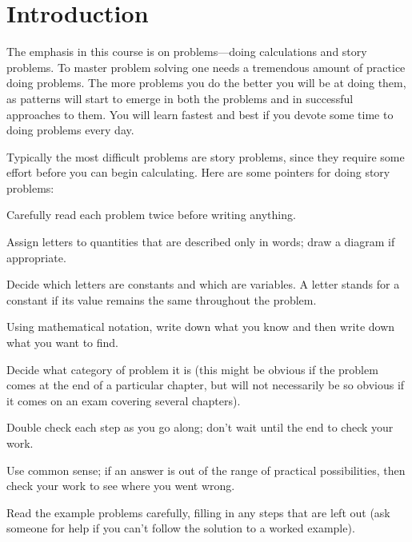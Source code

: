 \chapter{Introduction}{}

The emphasis in this course is on problems---doing calculations and story
problems.  To master problem solving one needs a tremendous amount of
practice doing problems. The more problems you do the better you will
be at doing them, as patterns will start to emerge in both the
problems and in successful approaches to them. You will learn fastest
and best if you devote some time to doing problems every day.

Typically the most difficult problems are story problems, since they
require some effort before you can begin calculating.
Here are some pointers for doing story problems:

\beginlist

\item{\question}
Carefully read each problem twice before writing anything.

\item {\question}
Assign letters to quantities that are described only in words;
draw a diagram if appropriate.

\item{\question}
Decide which letters are constants and which are variables.  A letter
stands for a constant if its value remains the same throughout the problem.

\item{\question}
Using mathematical notation, write down what you know and then write down
what you want to find.

\item{\question}
Decide what category of problem it is (this might be obvious if the
problem comes at the end of a particular chapter, but will not necessarily
be so obvious if it comes on an exam covering several chapters).

\item{\question}
Double check each step as you go along; don't wait until the end to
check your work.

\item{\question}
Use common sense; if an answer is out of the range of practical
possibilities, then check your work to see where you went wrong.

\endlist

\bsk
{}

\beginlist
\item{\question}
Read the example problems carefully, filling in any steps that are
left out (ask someone for help if you can't follow the solution to a worked
example).

